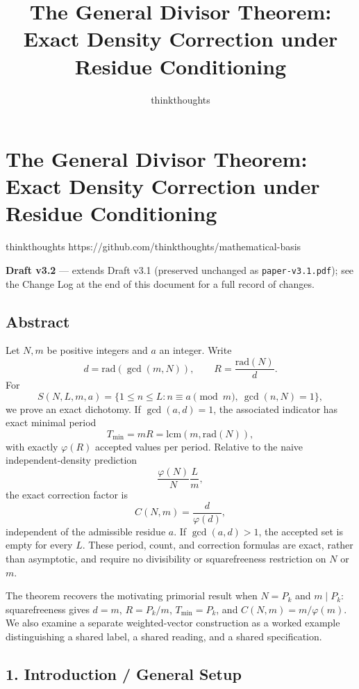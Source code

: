 \documentclass[
]{article}
\author{}
\date{}
\title{The General Divisor Theorem: Exact Density Correction under Residue Conditioning}
\author{thinkthoughts}
\date{}
\begin{document}
\maketitle

\section{The General Divisor Theorem: Exact Density Correction under
Residue
Conditioning}\label{the-general-divisor-theorem-exact-density-correction-under-residue-conditioning}

thinkthoughts https://github.com/thinkthoughts/mathematical-basis

\textbf{Draft v3.2} --- extends Draft v3.1 (preserved unchanged as
\texttt{paper-v3.1.pdf}); see the Change Log at the end of this document
for a full record of changes.

\subsection{Abstract}\label{abstract}

Let \(N,m\) be positive integers and \(a\) an integer. Write \[
d=\mathrm{rad}(\gcd(m,N)),
\qquad
R=\frac{\mathrm{rad}(N)}{d}.
\] For \[
S(N,L,m,a)
=
\{1\le n\le L:n\equiv a\pmod m,\ \gcd(n,N)=1\},
\] we prove an exact dichotomy. If \(\gcd(a,d)=1\), the associated
indicator has exact minimal period \[
T_{\min}=mR=\mathrm{lcm}(m,\mathrm{rad}(N)),
\] with exactly \(\varphi(R)\) accepted values per period. Relative to
the naive independent-density prediction \[
\frac{\varphi(N)}{N}\frac{L}{m},
\] the exact correction factor is \[
C(N,m)=\frac{d}{\varphi(d)},
\] independent of the admissible residue \(a\). If \(\gcd(a,d)>1\), the
accepted set is empty for every \(L\). These period, count, and
correction formulas are exact, rather than asymptotic, and require no
divisibility or squarefreeness restriction on \(N\) or \(m\).

The theorem recovers the motivating primorial result when \(N=P_k\) and
\(m\mid P_k\): squarefreeness gives \(d=m\), \(R=P_k/m\),
\(T_{\min}=P_k\), and \(C(N,m)=m/\varphi(m)\). We also examine a
separate weighted-vector construction as a worked example distinguishing
a shared label, a shared reading, and a shared specification.

\subsection{1. Introduction / General
Setup}\label{introduction-general-setup}
\end{document}
